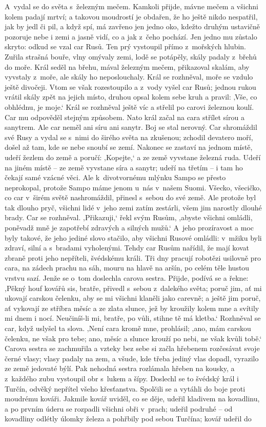 A~vydal se do světa s železným mečem. Kamkoli přijde, mávne mečem a všichni kolem padají mrtví; a takovou moudrostí je obdařen, že ho ještě nikdo nespatřil, jak by jedl či pil, a když spí, má zavřeno jen jedno oko, kdežto druhým ustavičně pozoruje nebe i zemi a jasně vidí, co a jak z čeho pochází. Jen jedno mu zůstalo skryto: odkud se vzal car Rusů. Ten prý vystoupil přímo z mořských hlubin. Zuřila strašná bouře, vlny omývaly zemi, lodě se potápěly, skály padaly z břehů do moře. Král seděl na břehu, mával železným mečem, přikazoval skalám, aby vyvstaly z moře, ale skály ho neposlouchaly. Král se rozhněval, moře se vzdulo ještě divočeji. Vtom se však rozestoupilo a z vody vyšel car Rusů; jednou rukou vrátil skály zpět na jejich místo, druhou opsal kolem sebe kruh a pravil: ‚Vše, co obhlédnu, je moje.‘ Král se rozhněval ještě víc a střelil po carovi železnou koulí. Car mu odpověděl stejným způsobem. Nato král začal na cara střílet sírou a sanytrem. Ale car neměl ani síru ani sanytr. Boj se stal nerovný. Car shromáždil své Rusy a vydal se s nimi do širého světa na zkušenou; zchodil devatero moří, došel až tam, kde se nebe snoubí se zemí. Nakonec se zastaví na jednom místě, udeří žezlem do země a poručí: ‚Kopejte,‘ a ze země vyvstane železná ruda. Udeří na jiném místě -- ze země vyvstane síra a sanytr; udeří na třetím -- i tam ho čekají samé vzácné věci. Ale k divotvornému mlýnku Sampo se přesto neprokopal, protože Sampo máme jenom u~nás v našem Suomi. Všecko, všecičko, co car v širém světě nashromáždil, přinesl s sebou do své země. Ale protože byl tak dlouho pryč, všichni lidé v jeho zemi zatím zestárli, všem jim narostly dlouhé brady. Car se rozhněval. ‚Přikazuji,‘ řekl svým Rusům, ,abyste všichni omládli, poněvadž mně je zapotřebí zdravých a silných mužů.‘ A~jeho prozíravost a moc byly takové, že jeho jediné slovo stačilo, aby všichni Rusové omládli: v mžiku byli zdraví, silní a s bradami vyholenými. Tehdy car Rusům nařídil, že mají kovat zbraně proti jeho nepříteli, švédskému králi. Tři dny pracují robotězi usilovně pro cara, na zádech prachu na sáh, mouru na hlavě na aršín, po celém těle hustou vrstvu sazí. Jenže se o~tom doslechla carova sestra. Přijde, podívá se a řekne: ‚Pěkný houf kovářů sis, bratře, přivedl s sebou z dalekého světa; poruč jim, ať mi ukovají carskou čelenku, aby se mi všichni klaněli jako carevně; a ještě jim poruč, ať vykovají ze stříbra měsíc a ze zlata slunce, jež by kroužily kolem mne a svítily mi dnem i nocí. Neučiníš-li mi, bratře, po vůli, stihne tě má kletba.‘ Rozhněval se car, když uslyšel ta slova. ‚Není cara kromě mne, prohlásil; ‚ano, mám carskou čelenku, ne však pro tebe; ano, měsíc a slunce krouží po nebi, ne však kvůli tobě.‘ Carova sestra se zachmuřila a vzteky bez sebe si začla hřebenem rozčesávat svoje černé vlasy; vlasy padaly na zem, a všude, kde třeba jediný vlas dopadl, vyrazilo ze země jedovaté býlí. Pak nehodná sestra rozlámala hřeben na kousky, a z každého zubu vystoupil obr s lukem a šípy. Doslechl se to švédský král i Turčín, odvěký nepřítel všeho křesťanstva. Spolčili se a vytáhli do boje proti moudrému kováři. Jakmile kovář uviděl, co se děje, udeřil kladivem na kovadlinu, a po prvním úderu se rozpadli všichni obři v prach; udeřil podruhé -- od kovadliny odlétly úlomky železa a pohřbily pod sebou Turčína; kovář udeřil do 